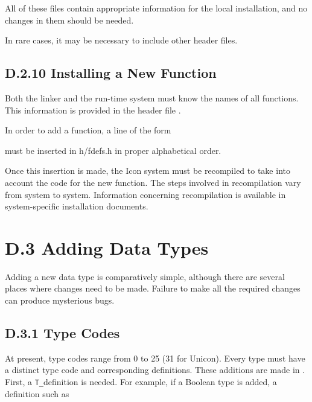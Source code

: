 
\noindent
All of these files contain appropriate information for the local
installation, and no changes in them should be needed.


In rare cases, it may be necessary to include other header files.
%

\subsection[D.2.10 Installing a New Function]{D.2.10 Installing a New Function}

Both the linker and the run-time system must know the names of all
functions. This information is provided in the header file .


In order to add a function, a line of the form

\noindent must be inserted in h/fdefs.h in proper alphabetical order.

Once this insertion is made, the Icon system must be recompiled to
take into account the code for the new function. The steps involved in
recompilation vary from system to system. Information concerning
recompilation is available in system-specific installation documents.

\section[D.3 Adding Data Types]{D.3 Adding Data Types}

Adding a new data type is comparatively simple, although there are
several places where changes need to be made. Failure to make all the
required changes can produce mysterious bugs.

\subsection[D.3.1 Type Codes]{D.3.1 Type Codes}

At present, type codes range from 0 to 25 {\color{blue} (31 for
Unicon)}. Every type must have a distinct type code and corresponding
definitions.  These additions are made in . First, a
\texttt{T\_}definition is needed. For example, if a Boolean type is added,
a definition such as

